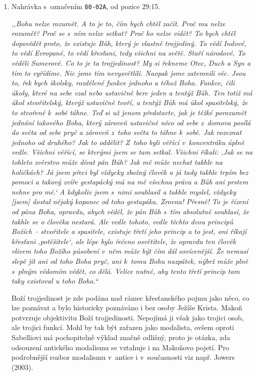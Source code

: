 \begin{enumerate}

\item{%
Nahrávka s~označením \texttt{80-02A}, od pozice 29:15.

\textit{%
,,Bohu nelze rozumět. A to je to, čím bych chtěl začít. Proč mu nelze rozumět?
Proč se s~ním
nelze setkat? Proč ho nelze vidět? To bych chtěl dopovědět proto, že existuje
Bůh,
který je vlastně trojjediný. To vědí Indové, to vědí Evropané, to vědí křesťani,
tedy všichni na světě. Staří národové. To věděli Sumerové. Co to je ta
trojjedinost? My si řekneme Otec, Duch a Syn a tím to
vyřídíme. Nic jsme tím nevysvětlili. Naopak jsme zatemnili věc. Jsou to, řek bych
školsky, rozdělené funkce jednoho a téhož Boha. Funkce, čili úkoly, které na sebe
vzal nebo ustavičně bere jeden a tentýž Bůh. Ten totiž má úkol stvořitelský,
kterýž ustavičně tvoří, a tentýž Bůh má úkol spasitelský, že to stvořené k~sobě
táhne. Teď si už jenom představte, jak je těžké porozumět jednání takového Boha,
který zároveň ustavičně něco od sebe z~domova posílá do světa od sebe pryč a zároveň
z~toho světa to táhne k~sobě. Jak rozeznat jednoho od druhého? Jak to oddělit?
Z~toho byli věřící
v~koncentráku úplně vedle. Všichni věřící, se kterými jsem se tam setkal.
Všichni říkali: ,Jak se
na tohleto zvěrstvo může dívat pán Bůh? Jak mě může nechat takhle na holičkách?
Já
jsem přeci byl vždycky zbožný člověk a já tady takhle trpím bez pomoci a takový
zvíře gestapácký má na mě všechna práva a Bůh ani prstem nehne pro mě.` A kdykoliv
jsem s~nimi souhlasil a takhle myslel, vždycky [jsem] dostal nějaký kopanec od
toho gestapáka. Zrovna! Přesně! To je řízení od pána Boha, opravdu, abych věděl, že
pán Bůh s~tím absolutně souhlasí, že takhle se o člověka nestará. Ale vedle
tohoto,
vedle těchto dvou principů Božích -- stvořitele a spasitele, existuje třetí jeho princip a
to jest, oni říkají křesťani ,potěšitele`, ale lépe bylo řečeno osvětitele, že
opravdu ten člověk vlivem toho Božího působení v~něm může být čím dál
osvícenější. Že nemusí slepě jít ani od toho Boha pryč, ani k~tomu Bohu
nazpátek,
nýbrž může plně s~plným vědomím vědět, co dělá. Velice nutné, aby tento třetí
princip tam taky existoval u toho Boha.``
}

Boží trojjedinost je zde podána nad rámec křesťanského pojmu jako něco, co lze
poznávat a bylo historicky poznáváno i bez osoby Ježíše Krista. Makoň potvrzuje
objektivitu Boží trojjedinosti. Nepojímá ji však jako trojici osob, ale trojici
        funkcí. Mohl by tak být zařazen jako modalista, ovšem oproti
        Sabelliovi\cite{lyman2013sabellius} má
pochopitelně výklad značně odlišný, proto je otázka, zda odsouzení antického
        modalismu se vztahuje i na Makoňovo pojetí. Pro podrobnější rozbor modalismu v~antice i
v~současnosti viz např. Jowers (2003)\cite{jowers2003reproach}.

}
\end{enumerate}
